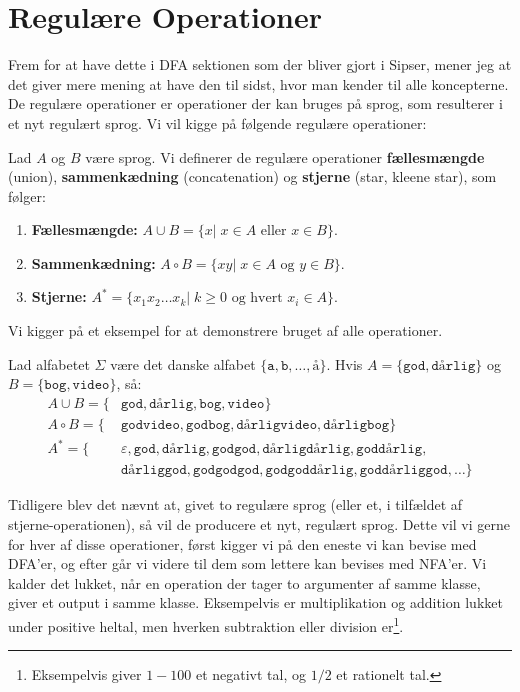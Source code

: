 \newpage
\section{Regulære Operationer}

Frem for at have dette i DFA sektionen som der bliver gjort i Sipser, mener jeg at det giver mere mening at have den til sidst, hvor man kender til alle koncepterne. De regulære operationer er operationer der kan bruges på sprog, som resulterer i et nyt regulært sprog. Vi vil kigge på følgende regulære operationer:

\begin{definition}
	Lad $A$ og $B$ være sprog. Vi definerer de regulære operationer \textbf{fællesmængde} (union), \textbf{sammenkædning} (concatenation) og \textbf{stjerne} (star, kleene star), som følger:
	\begin{enumerate}
		\item \textbf{Fællesmængde:} $A \cup B = \{x |\; x \in A \text{ eller } x \in B \}$.
		\item \textbf{Sammenkædning:} $A \circ B = \{xy |\; x \in A \text{ og } y \in B\}$.
		\item \textbf{Stjerne:} $A^{*} = \{x_{1}x_{2}\ldots x_{k} |\; k \geq 0 \text{ og hvert } x_{i} \in A\}$.
	\end{enumerate}
\end{definition}

Vi kigger på et eksempel for at demonstrere bruget af alle operationer.

\begin{example}
	Lad alfabetet $\Sigma$ være det danske alfabet $\{\mathtt{a, b, \ldots, å}\}$. Hvis $A = \{\mathtt{god, dårlig}\}$ og $B = \{\mathtt{bog, video}\}$, så:
	\begin{equation*}
		\begin{split}
			A \cup B = \{&\mathtt{god, dårlig, bog, video}\}\\
			A \circ B = \{&\mathtt{godvideo, godbog, dårligvideo, dårligbog}\}\\
			A^{*} = \{&\varepsilon, \mathtt{god, dårlig, godgod, dårligdårlig, goddårlig,}\\
			&\mathtt{dårliggod, godgodgod, godgoddårlig, goddårliggod, \ldots}\}
		\end{split}
	\end{equation*}
\end{example}

Tidligere blev det nævnt at, givet to regulære sprog (eller et, i tilfældet af stjerne-operationen), så vil de producere et nyt, regulært sprog. Dette vil vi gerne for hver af disse operationer, først kigger vi på den eneste vi kan bevise med DFA'er, og efter går vi videre til dem som lettere kan bevises med NFA'er. Vi kalder det lukket, når en operation der tager to argumenter af samme klasse, giver et output i samme klasse. Eksempelvis er multiplikation og addition lukket under positive heltal, men hverken subtraktion eller division er\footnote{Eksempelvis giver $1-100$ et negativt tal, og $1/2$ et rationelt tal.}.

